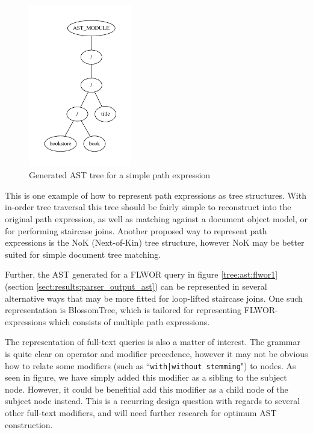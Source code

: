 \begin{figure}[h!]
\centering
 \includegraphics[width=0.4\textwidth]{img/graphs/path1}
\caption{Generated AST tree for a simple path expression}
\label{fig:discussion:ast:path1}
\end{figure}

This is one example of how to represent path expressions as tree structures.
With in-order tree traversal this tree should be fairly simple to reconstruct  
into the original path expression, as well as matching against a document object
model, or for performing staircase joins\cite{pathfinder_staircase}. Another  
proposed way to represent path expressions is the NoK (Next-of-Kin) tree
structure\cite{zhang_nok}, however NoK may be better suited for simple document
tree matching.

Further, the AST generated for a FLWOR query in figure \ref{tree:ast:flwor1}
(section \ref{sect:results:parser_output_ast}) can be represented in several
alternative ways that may be more fitted for loop-lifted staircase
joins\cite{pathfinder_staircase}. One such representation is
BlossomTree\cite{zhang_blossomtree}, which is tailored for representing
FLWOR-expressions which consists of multiple path expressions.

The representation of full-text queries is also a matter of interest. The
grammar is quite clear on operator and modifier precedence, however it may not
be obvious how to relate some modifiers (such as 
``\verb!with|without stemming!") to nodes. As seen in figure, we have simply
added this modifier as a sibling to the subject node. However, it could be
benefitial add this modifier as a child node of the subject node instead. This
is a recurring design question with regards to several other full-text
modifiers, and will need further research for optimum AST construction.

